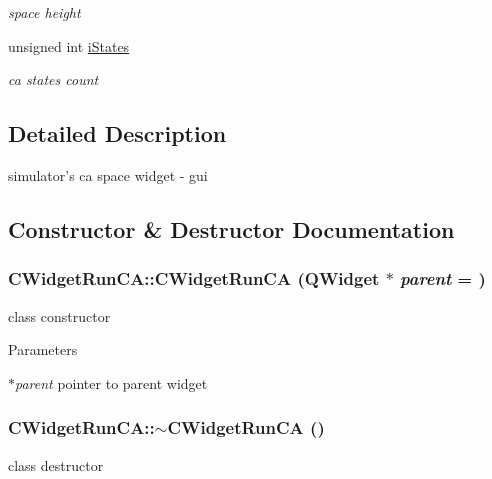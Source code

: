 \begin{DoxyCompactItemize}
\begin{DoxyCompactList}\small\item\em space height \item\end{DoxyCompactList}\item 
\hypertarget{classCWidgetRunCA_af4f147b9d78186cc17c56f94efc785b5}{
unsigned int \hyperlink{classCWidgetRunCA_af4f147b9d78186cc17c56f94efc785b5}{iStates}}
\label{classCWidgetRunCA_af4f147b9d78186cc17c56f94efc785b5}

\begin{DoxyCompactList}\small\item\em ca states count \item\end{DoxyCompactList}\end{DoxyCompactItemize}


\subsection{Detailed Description}
simulator's ca space widget -\/ gui 

\subsection{Constructor \& Destructor Documentation}
\hypertarget{classCWidgetRunCA_a9caedb86747ca43e4fb25a47540dc913}{
\subsubsection[{CWidgetRunCA}]{\setlength{\rightskip}{0pt plus 5cm}CWidgetRunCA::CWidgetRunCA (QWidget $\ast$ {\em parent} = {})}}
\label{classCWidgetRunCA_a9caedb86747ca43e4fb25a47540dc913}
class constructor


\begin{DoxyParams}{Parameters}
\item[{\em $\ast$parent}]pointer to parent widget \end{DoxyParams}
\hypertarget{classCWidgetRunCA_a1bce231d5077c8379aa7004ff09ca882}{
\subsubsection[{$\sim$CWidgetRunCA}]{\setlength{\rightskip}{0pt plus 5cm}CWidgetRunCA::$\sim$CWidgetRunCA ()}}
\label{classCWidgetRunCA_a1bce231d5077c8379aa7004ff09ca882}
class destructor 

